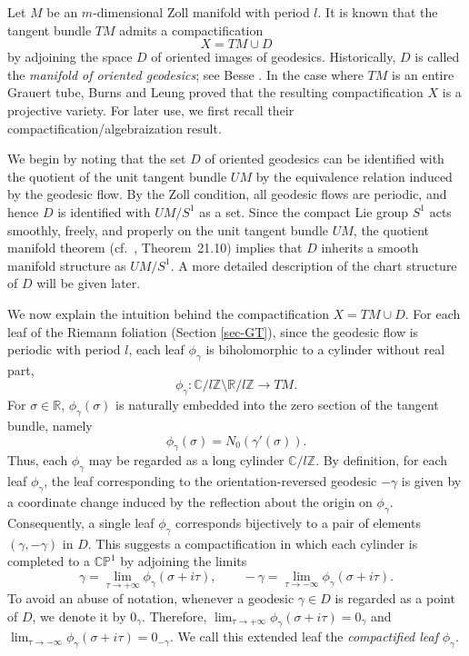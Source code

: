 \documentclass[a4paper, 12pt]{article}
\newcommand{\bR}{\mathbb{R}}
\begin{document}


Let $M$ be an $m$-dimensional Zoll manifold with period $l$. It is known that the tangent bundle $TM$ admits a compactification
\[
X = TM \cup D
\]
by adjoining the space $D$ of oriented images of geodesics. Historically, $D$ is called the \emph{manifold of oriented geodesics}; see Besse \cite[Chapter 2]{B12}. In the case where $TM$ is an entire Grauert tube, Burns and Leung \cite{BL18} proved that the resulting compactification $X$ is a projective variety. For later use, we first recall their compactification/algebraization result. 

We begin by noting that the set $D$ of oriented geodesics can be identified with the quotient of the unit tangent bundle $UM$ by the equivalence relation induced by the geodesic flow. By the Zoll condition, all geodesic flows are periodic, and hence $D$ is identified with $UM/S^1$ as a set. Since the compact Lie group $S^1$ acts smoothly, freely, and properly on the unit tangent bundle $UM$, the quotient manifold theorem (cf.~\cite{L03}, Theorem~21.10) implies that $D$ inherits a smooth manifold structure as $UM/S^1$. A more detailed description of the chart structure of $D$ will be given later.

We now explain the intuition behind the compactification $X = TM \cup D$. For each leaf of the Riemann foliation (Section \ref{sec-GT}), since the geodesic flow is periodic with period $l$, each leaf $\phi_\gamma$ is biholomorphic to a cylinder without real part,
\[
\phi_\gamma \colon \mathbb{C}/l\mathbb{Z} \setminus \mathbb{R}/l\mathbb{Z} \to TM.
\]
For $\sigma\in\bR$, $\phi_\gamma(\sigma)$ is naturally embedded into the zero section of the tangent bundle, namely
\[
\phi_\gamma(\sigma) = N_0(\gamma'(\sigma)).
\]
Thus, each $\phi_\gamma$ may be regarded as a long cylinder $\mathbb{C}/l\mathbb{Z}$. By definition, for each leaf $\phi_\gamma$, the leaf corresponding to the orientation-reversed geodesic $-\gamma$ is given by a coordinate change induced by the reflection about the origin on $\phi_\gamma$. Consequently, a single leaf $\phi_\gamma$ corresponds bijectively to a pair of elements $(\gamma,-\gamma)$ in $D$. This suggests a compactification in which each cylinder is completed to a $\mathbb{CP}^1$ by adjoining the limits
\[
\gamma = \lim_{\tau \to +\infty} \phi_\gamma(\sigma + i\tau),
\qquad
-\gamma = \lim_{\tau \to -\infty} \phi_\gamma(\sigma + i\tau).
\]
To avoid an abuse of notation, whenever a geodesic $\gamma \in D$ is regarded as a point of $D$, we denote it by $0_\gamma$. Therefore, $\lim_{\tau \to +\infty} \phi_\gamma(\sigma + i\tau)=0_\gamma$ and $\lim_{\tau \to -\infty} \phi_\gamma(\sigma + i\tau)=0_{-\gamma}$. We call this extended leaf the \textit{compactified leaf} $\phi_\gamma$.
\end{document}
